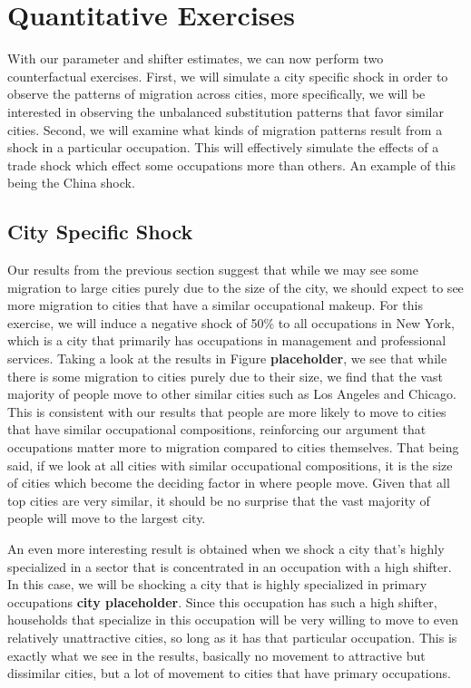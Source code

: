 \documentclass[10pt]{article}
\begin{document}
\section{Quantitative Exercises}

With our parameter and shifter estimates, we can now perform two counterfactual exercises. First, we will simulate a city specific shock in order to observe the patterns of migration across cities, more specifically, we will be interested in observing the unbalanced substitution patterns that favor similar cities. Second, we will examine what kinds of migration patterns result from a shock in a particular occupation. This will effectively simulate the effects of a trade shock which effect some occupations more than others. An example of this being the China shock.

\subsection{City Specific Shock}

Our results from the previous section suggest that while we may see some migration to large cities purely due to the size of the city, we should expect to see more migration to cities that have a similar occupational makeup. For this exercise, we will induce a negative shock of 50\% to all occupations in New York, which is a city that primarily has occupations in management and professional services. Taking a look at the results in Figure \textbf{placeholder}, we see that while there is some migration to cities purely due to their size, we find that the vast majority of people move to other similar cities such as Los Angeles and Chicago. This is consistent with our results that people are more likely to move to cities that have similar occupational compositions, reinforcing our argument that occupations matter more to migration compared to cities themselves. That being said, if we look at all cities with similar occupational compositions, it is the size of cities which become the deciding factor in where people move. Given that all top cities are very similar, it should be no surprise that the vast majority of people will move to the largest city.

An even more interesting result is obtained when we shock a city that's highly specialized in a sector that is concentrated in an occupation with a high shifter. In this case, we will be shocking a city that is highly specialized in primary occupations \textbf{city placeholder}. Since this occupation has such a high shifter, households that specialize in this occupation will be very willing to move to even relatively unattractive cities, so long as it has that particular occupation. This is exactly what we see in the results, basically no movement to attractive but dissimilar cities, but a lot of movement to cities that have primary occupations.
\end{document}
